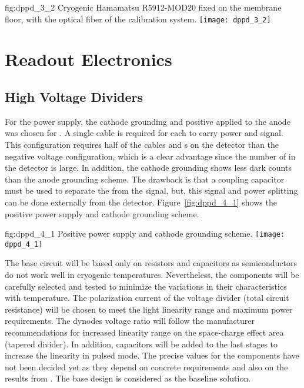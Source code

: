 \begin{dunefigure}{fig:dppd_3_2}
{Cryogenic Hamamatsu R5912-MOD20  fixed on the membrane floor, with the optical fiber of the calibration system.}
\texttt{[image: dppd\_3\_2]}
\end{dunefigure}

\section{Readout Electronics}
\label{sec:fddp-pd-4}

\subsection{ High Voltage Dividers}
\label{sec:fddp-pd-4.1}

For the  power supply, the cathode grounding and positive  applied to the anode was chosen for . A single cable is required for each  to carry power and signal. This configuration requires half of the cables and \fdth{}s on the detector than the negative voltage configuration, which is a clear advantage since the number of  in the detector is large. In addition, the cathode grounding shows less dark counts than the anode grounding scheme. The drawback is that a coupling capacitor must be used to separate the  from the  signal, but, this signal and power splitting can be done externally from the detector. Figure~\ref{fig:dppd_4_1} shows the positive power supply and cathode grounding scheme.

\begin{dunefigure}{fig:dppd_4_1}
{Positive power supply and cathode grounding scheme.}
\texttt{[image: dppd\_4\_1]}
\end{dunefigure}

The  base circuit will be based only on resistors and capacitors as semiconductors do not work well in cryogenic temperatures. Nevertheless, the components will be carefully selected and tested to minimize the variations in their characteristics with temperature. The polarization current of the voltage divider (total circuit resistance) will be chosen to meet the  light linearity range and maximum power requirements. The dynodes voltage ratio will follow the manufacturer recommendations for increased linearity range on the space-charge effect area (tapered divider). In addition, capacitors will be added to the last stages to increase the  linearity in pulsed mode. The precise values for the components have not been decided yet as they depend on concrete requirements and also on the results from . The  base design is considered as the baseline solution.

